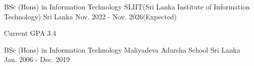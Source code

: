 

\begin{cventries}

  \cventry
    {BSc (Hons) in Information Technology} %
    {SLIIT(Sri Lanka Institute of Information Technology)} %
    {Sri Lanka} %
    {Nov. 2022 - Nov. 2026(Expected)} %
    {
      \begin{cvitems} %
        \item {Current GPA 3.4}
      \end{cvitems}
    }

  \cventry
    {BSc (Hons) in Information Technology} %
    {Maliyadeva Adarsha School} %
    {Sri Lanka} %
    {Jan. 2006 - Dec. 2019} %
    {
    }

\end{cventries}
